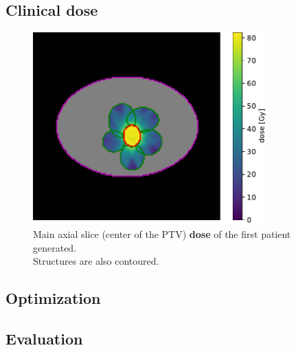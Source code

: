 \subsection*{Clinical dose}

\begin{figure}
	\centering
	\includegraphics[width=0.8\textwidth]{main_slice-dose.pdf}
	\caption{Main axial slice (center of the PTV) \textbf{dose} of the first patient generated.\\
	Structures are also contoured.}
	\label{fig:main_slice-dose}
\end{figure}

\subsection*{Optimization}

\subsection*{Evaluation}


